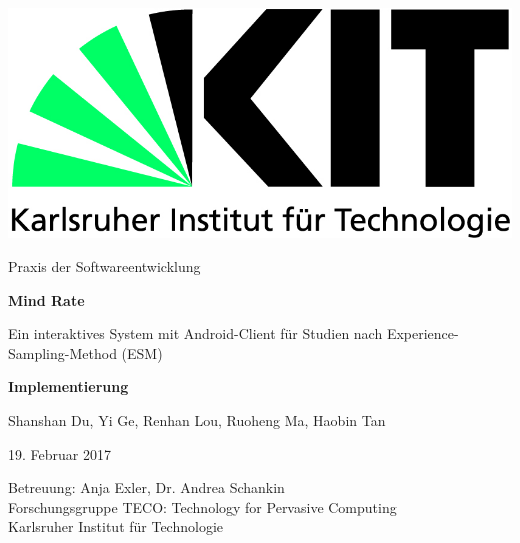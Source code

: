 \documentclass[a4paper]{scrreprt}
\begin{document}
    \begin{flushright}
        \includegraphics[scale = 0.7]{kit-logo.jpg}\\[0.5cm]
    \end{flushright}
    \vspace*{2cm}

    \begin{center} \large

        Praxis der Softwareentwicklung
        \vspace * {1.5cm}

        \textbf{\huge Mind Rate}

        \vspace*{1cm}


        {\Large Ein interaktives System mit Android-Client f\"ur Studien nach Experience-Sampling-Method (ESM)}

        \vspace*{1cm}

        \textbf{\Large Implementierung}
        \vspace*{2cm}

        Shanshan Du, Yi Ge, Renhan Lou, Ruoheng Ma, Haobin Tan
        \vspace*{1cm}

        19. Februar 2017
        \vspace*{2.5cm}

        Betreuung: Anja Exler, Dr. Andrea Schankin\\[0.5cm]
        Forschungsgruppe TECO: Technology for Pervasive Computing\\[0.5cm]

        Karlsruher Institut für Technologie
    \end{center}
    \thispagestyle{empty}
\end{document}
